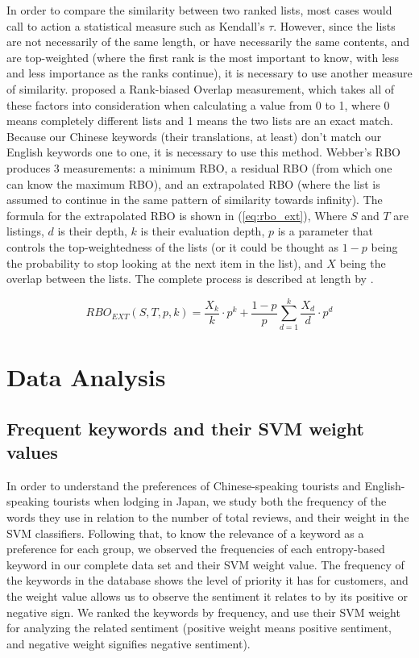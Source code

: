 In order to compare the similarity between two ranked lists, most cases would call to action a statistical measure such as Kendall's \(\tau\). However, since the lists are not necessarily of the same length, or have necessarily the same contents, and are top-weighted (where the first rank is the most important to know, with less and less importance as the ranks continue), it is necessary to use another measure of similarity. \cite{webber2010similarity} proposed a Rank-biased Overlap measurement, which takes all of these factors into consideration when calculating a value from 0 to 1, where 0 means completely different lists and 1 means the two lists are an exact match. Because our Chinese keywords (their translations, at least) don't match our English keywords one to one, it is necessary to use this method. Webber's RBO produces 3 measurements: a minimum RBO, a residual RBO (from which one can know the maximum RBO), and an extrapolated RBO (where the list is assumed to continue in the same pattern of similarity towards infinity). The formula for the extrapolated RBO is shown in (\ref{eq:rbo_ext}), Where \(S\) and \(T\) are listings, \(d\) is their depth, \(k\) is their evaluation depth, \(p\) is a parameter that controls the top-weightedness of the lists (or it could be thought as \(1-p\) being the probability to stop looking at the next item in the list), and \(X\) being the overlap between the lists. The complete process is described at length by \cite{webber2010similarity}.

\begin{equation}\label{eq:rbo_ext}
RBO_{EXT}(S,T,p,k) = \frac{X_k}{k} \cdot p^k + \frac{1-p}{p} \sum_{d=1}^k{\frac{X_d}{d} \cdot p^d}
\end{equation}

\section{Data Analysis}\label{dataanalysis}

\subsection{Frequent keywords and their SVM weight values}\label{svmresults}

In order to understand the preferences of Chinese-speaking tourists and English-speaking tourists when lodging in Japan, we study both the frequency of the words they use in relation to the number of total reviews, and their weight in the SVM classifiers. Following that, to know the relevance of a keyword as a preference for each group, we observed the frequencies of each entropy-based keyword in our complete data set and their SVM weight value. The frequency of the keywords in the database shows the level of priority it has for customers, and the weight value allows us to observe the sentiment it relates to by its positive or negative sign. We ranked the keywords by frequency, and use their SVM weight for analyzing the related sentiment (positive weight means positive sentiment, and negative weight signifies negative sentiment). 

